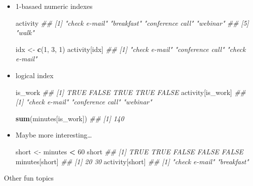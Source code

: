 \documentclass[
]{book}
\newenvironment{Shaded}{\begin{snugshade}}{\end{snugshade}}
\newcommand{\CommentTok}[1]{\textcolor[rgb]{0.56,0.35,0.01}{\textit{#1}}}
\newcommand{\DecValTok}[1]{\textcolor[rgb]{0.00,0.00,0.81}{#1}}
\newcommand{\KeywordTok}[1]{\textcolor[rgb]{0.13,0.29,0.53}{\textbf{#1}}}
\newcommand{\NormalTok}[1]{#1}
\newcommand{\OperatorTok}[1]{\textcolor[rgb]{0.81,0.36,0.00}{\textbf{#1}}}
\newcommand{\StringTok}[1]{\textcolor[rgb]{0.31,0.60,0.02}{#1}}
\begin{document}
\begin{itemize}
\item
  1-basaed numeric indexes

\begin{Shaded}
\begin{Highlighting}[]
\NormalTok{activity}
\CommentTok{## [1] "check e-mail"    "breakfast"       "conference call" "webinar"        }
\CommentTok{## [5] "walk"}

\NormalTok{idx <-}\StringTok{ }\KeywordTok{c}\NormalTok{(}\DecValTok{1}\NormalTok{, }\DecValTok{3}\NormalTok{, }\DecValTok{1}\NormalTok{)}
\NormalTok{activity[idx]}
\CommentTok{## [1] "check e-mail"    "conference call" "check e-mail"}
\end{Highlighting}
\end{Shaded}
\item
  logical index

\begin{Shaded}
\begin{Highlighting}[]
\NormalTok{is_work}
\CommentTok{## [1]  TRUE FALSE  TRUE  TRUE FALSE}
\NormalTok{activity[is_work]}
\CommentTok{## [1] "check e-mail"    "conference call" "webinar"}

\KeywordTok{sum}\NormalTok{(minutes[is_work])}
\CommentTok{## [1] 140}
\end{Highlighting}
\end{Shaded}
\item
  Maybe more interesting\ldots{}

\begin{Shaded}
\begin{Highlighting}[]
\NormalTok{short <-}\StringTok{ }\NormalTok{minutes }\OperatorTok{<}\StringTok{ }\DecValTok{60}
\NormalTok{short}
\CommentTok{## [1]  TRUE  TRUE FALSE FALSE FALSE}
\NormalTok{minutes[short]}
\CommentTok{## [1] 20 30}
\NormalTok{activity[short]}
\CommentTok{## [1] "check e-mail" "breakfast"}
\end{Highlighting}
\end{Shaded}
\end{itemize}

Other fun topics
\end{document}
